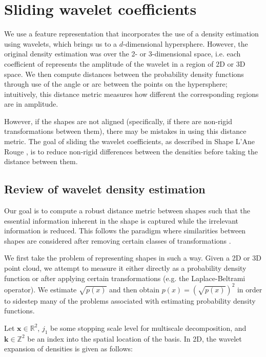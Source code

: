 \documentclass[../tech_report_1.tex]{subfiles}
\begin{document}
\section{Sliding wavelet coefficients\label{sliding}}

We use a feature representation that incorporates the use of a density estimation using wavelets, which brings us to a $d$-dimensional hypersphere. However, the original density estimation was over the 2- or 3-dimensional space, i.e. each coefficient of represents the amplitude of the wavelet in a region of 2D or 3D space. We then compute distances between the probability density functions through use of the angle or arc between the points on the hypersphere; intuitively, this distance metric measures how different the corresponding regions are in amplitude.

However, if the shapes are not aligned (specifically, if there are non-rigid transformations between them), there may be mistakes in using this distance metric. The goal of sliding the wavelet coefficients, as described in Shape L'Ane Rouge \cite{peter2008shape}, is to reduce non-rigid differences between the densities before taking the distance between them.

\subsection{Review of wavelet density estimation}

Our goal is to compute a robust distance metric between shapes such that the essential information inherent in the shape is captured while the irrelevant information is reduced. This follows the paradigm where similarities between shapes are considered after removing certain classes of transformations \cite{peter2008shape,klein1893comparative}.

We first take the problem of representing shapes in such a way. Given a 2D or 3D point cloud, we attempt to measure it either directly as a probability density function or after applying certain transformations (e.g. the Laplace-Beltrami operator). We estimate $\sqrt{p(x)}$ and then obtain $p(x) = (\sqrt{p(x)})^2$ in order to sidestep many of the problems associated with estimating probability density functions. 

Let $\bm{x} \in \mathbb{R}^2$, $j_1$ be some stopping scale level for multiscale decomposition, and $\bm{k} \in \mathbb{Z}^2$ be an index into the spatial location of the basis. In 2D, the wavelet expansion of densities is given as follows: 
\end{document}
